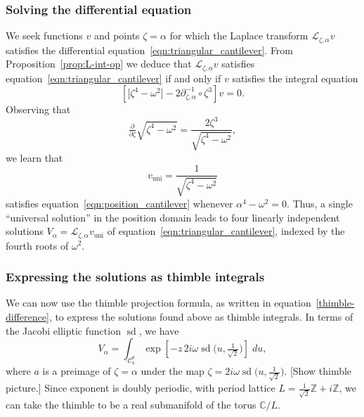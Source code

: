\documentclass{article}
\newcommand{\Z}{\mathbb{Z}}
\newcommand{\C}{\mathbb{C}}
\newcommand{\fracderiv}[3]{\partial^{#1}_{#2, #3}}
\newcommand{\laplace}{\mathcal{L}}
\theoremstyle{definition}
\theoremstyle{plain}
\newenvironment{todo}{\color{Coral}}{\color{black}}
\begin{document}
\subsubsection{Solving the differential equation}
We seek functions $v$ and points $\zeta = \alpha$ for which the Laplace transform $\laplace_{\zeta, \alpha} v$ satisfies the differential equation~\eqref{eqn:triangular_cantilever}. From Proposition~\ref{prop:L-int-op} we deduce that $\laplace_{\zeta, \alpha} v$ satisfies equation~\eqref{eqn:triangular_cantilever} if and only if $v$ satisfies the integral equation
\begin{equation}\label{eqn:position_cantilever}
\left[ \big[ \zeta^4 - \omega^2 \big] - 2\fracderiv{-1}{\zeta}{\alpha} \circ \zeta^3 \right] v = 0.
\end{equation}
Observing that
\[ \tfrac{\partial}{\partial \zeta} \sqrt{\zeta^4 - \omega^2} = \frac{2\zeta^3}{\sqrt{\zeta^4 - \omega^2}}, \]
we learn that
\begin{equation}
v_\text{uni} = \frac{1}{\sqrt{\zeta^4 - \omega^2}}
\end{equation}
satisfies equation~\eqref{eqn:position_cantilever} whenever $\alpha^4 - \omega^2 = 0$. Thus, a single ``universal solution'' in the position domain leads to four linearly independent solutions $V_\alpha = \laplace_{\zeta, \alpha} v_\text{uni}$ of equation~\eqref{eqn:triangular_cantilever}, indexed by the fourth roots of $\omega^2$.
\subsubsection{Expressing the solutions as thimble integrals}
We can now use the thimble projection formula, as written in equation~\eqref{thimble-difference}, to express the solutions found above as thimble integrals. In terms of the Jacobi elliptic function $\operatorname{sd}$, we have
\begin{equation}\label{eq:cantilever-thimble}
V_\alpha = \int_{\mathcal{C}_a^\theta} \exp\left[ -z\,2i\omega \operatorname{sd}\big(u, \tfrac{1}{\sqrt{2}}\big) \right]\;du,  \end{equation}
where $a$ is a preimage of $\zeta = \alpha$ under the map $\zeta = 2i\omega \operatorname{sd}\big(u, \tfrac{1}{\sqrt{2}}\big)$. \begin{todo}[Show thimble picture.]\end{todo} Since exponent is doubly periodic, with period lattice $L = \tfrac{1}{\sqrt{2}}\Z + i\Z$, we can take the thimble to be a real submanifold of the torus $\C / L$.
\end{document}
